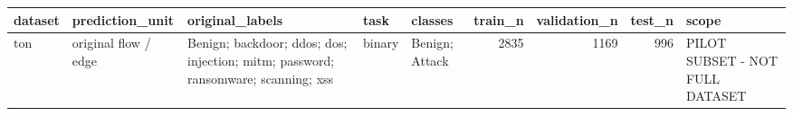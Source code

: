 \begin{tabular}{lllllrrrl}
\toprule
dataset & prediction\_unit & original\_labels & task & classes & train\_n & validation\_n & test\_n & scope \\
\midrule
ton & original flow / edge & Benign; backdoor; ddos; dos; injection; mitm; password; ransomware; scanning; xss & binary & Benign; Attack & 2835 & 1169 & 996 & PILOT SUBSET - NOT FULL DATASET \\
\bottomrule
\end{tabular}
